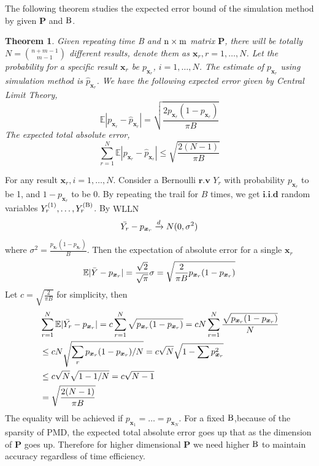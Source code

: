 \documentclass[12pt]{article}
\newcommand{\EE}{\mathbb{E}}
\newcommand{\Pmat}{\mathbf{P}}
\newcommand{\PMD}{\textrm{PMD}}
\newcommand{\wh}{\widehat}
\newtheorem{thm}{Theorem}
\begin{document}
The following theorem studies the expected error bound of the simulation method by given $\Pmat$ and $\rm B$.
\begin{thm}
Given repeating time \mbox{B} and $\rm n \times m$ matrix $\Pmat$, there will be totally  $N=\binom{n+m-1}{m-1}$ different results, denote them as  $\boldsymbol{x}_r, r=1,\dots,N$. Let the probability for a specific result $\boldsymbol{x}_{r}$ be $p_{\boldsymbol{x}_{r}}$, $i=1,\dots,N$. The estimate of  $p_{\boldsymbol{x}_{r}}$ using simulation method is $\wh{p}_{\boldsymbol{x}_r}$. We have the following expected error given by Central Limit Theory,
\begin{equation*}
    \EE|p_{\boldsymbol{x}_r} - \wh{p}_{\boldsymbol{x}_r}| =  \sqrt{\frac{2 p_{\boldsymbol{x}_r}(1-p_{\boldsymbol{x}_r})}{\pi B}}
\end{equation*}
The expected total absolute error,
$$\sum_{r=1}^{N} \EE|p_{\boldsymbol{x}_r} - \wh{p}_{\boldsymbol{x}_r}| \leq \sqrt{\frac{2(N-1)}{\pi B}}$$

\end{thm}
For any result $\boldsymbol{x}_r,i=1,\dots,N$. Consider a Bernoulli $\textbf{r.v}$ $Y_r$ with probability $p_{\boldsymbol{x}_r}$ to be 1, and $1-p_{\boldsymbol{x}_r}$ to be 0. By repeating the trail for $B$ times, we get $\textbf{i.i.d}$ random variables $Y_r^{(1)},\dots,Y_r^{(\rm B)}$. By $\textrm{WLLN}$
\begin{equation*}
    \Bar{Y_r}-p_{\boldsymbol{x}_r} \xrightarrow{d} N(0,\sigma^2)
\end{equation*}
where $\sigma^2 = \frac{p_{\boldsymbol{x}_r}(1-p_{\boldsymbol{x}_r})}{B}$. Then the expectation of absolute error for a single $\boldsymbol{x}_r$
\begin{equation*}
    \EE |\Bar{Y}-p_{\boldsymbol{x}_r}| = \frac{\sqrt{2}}{\sqrt{\pi}}\sigma = \sqrt{\frac{2}{\pi B}p_{\boldsymbol{x}_r}(1-p_{\boldsymbol{x}_r})}
\end{equation*}
Let $c = \sqrt{\frac{2}{\pi B}}$ for simplicity, then
\begin{align*}
    & \sum_{r=1}^{N}\EE |\Bar{Y_r}-p_{\boldsymbol{x}_r}| = c \sum_{r=1}^{N} \sqrt{p_{\boldsymbol{x}_r}(1-p_{\boldsymbol{x}_r})}  = c N \sum_{r=1}^{N}\frac{\sqrt{p_{\boldsymbol{x}_r}(1-p_{\boldsymbol{x}_r})}}{N} \\
    & \leq c N \sqrt{\sum_{r}p_{\boldsymbol{x}_r}(1-p_{\boldsymbol{x}_r})/N} = c \sqrt{N} \sqrt{1-\sum p_{\boldsymbol{x}_{r}}^2}\\ &\leq c \sqrt{N} \sqrt{1-1/N} = c\sqrt{N-1}\\
    & = \sqrt{\frac{2(N-1)}{\pi B}}
\end{align*}
The equality will be achieved if $p_{\boldsymbol{x}_1} = \dots = p_{\boldsymbol{x}_N}$. For a fixed $\rm B$,because of the sparsity of $\PMD$, the expected total absolute error goes up that as the dimension of $\Pmat$ goes up. Therefore for higher dimensional $\Pmat$ we need higher $\rm B$ to maintain accuracy regardless of time efficiency.
\end{document}
